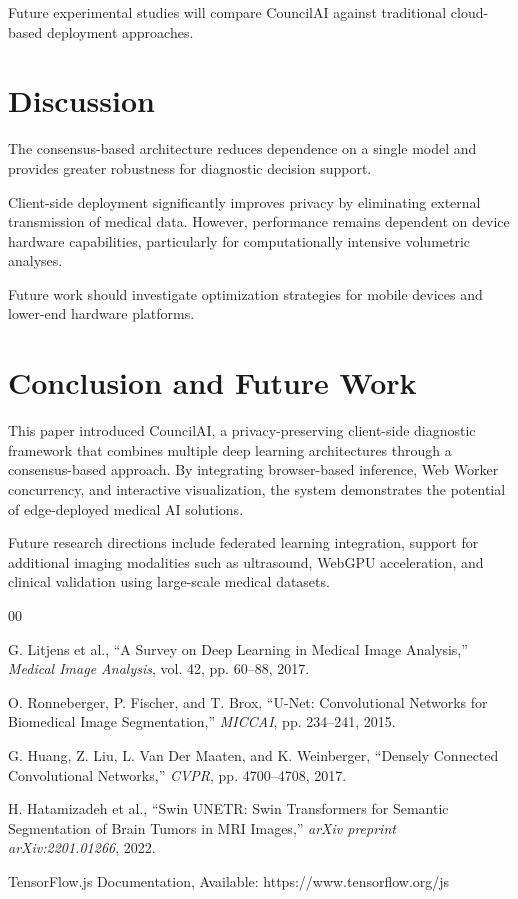 \documentclass[journal]{IEEEtran}
\begin{document}
Future experimental studies will compare CouncilAI against traditional cloud-based deployment approaches.

\section{Discussion}

The consensus-based architecture reduces dependence on a single model and provides greater robustness for diagnostic decision support.

Client-side deployment significantly improves privacy by eliminating external transmission of medical data. However, performance remains dependent on device hardware capabilities, particularly for computationally intensive volumetric analyses.

Future work should investigate optimization strategies for mobile devices and lower-end hardware platforms.

\section{Conclusion and Future Work}

This paper introduced CouncilAI, a privacy-preserving client-side diagnostic framework that combines multiple deep learning architectures through a consensus-based approach. By integrating browser-based inference, Web Worker concurrency, and interactive visualization, the system demonstrates the potential of edge-deployed medical AI solutions.

Future research directions include federated learning integration, support for additional imaging modalities such as ultrasound, WebGPU acceleration, and clinical validation using large-scale medical datasets.

\begin{thebibliography}{00}

G. Litjens et al.,
``A Survey on Deep Learning in Medical Image Analysis,''
\textit{Medical Image Analysis},
vol. 42, pp. 60--88, 2017.

O. Ronneberger, P. Fischer, and T. Brox,
``U-Net: Convolutional Networks for Biomedical Image Segmentation,''
\textit{MICCAI},
pp. 234--241, 2015.

G. Huang, Z. Liu, L. Van Der Maaten, and K. Weinberger,
``Densely Connected Convolutional Networks,''
\textit{CVPR},
pp. 4700--4708, 2017.

H. Hatamizadeh et al.,
``Swin UNETR: Swin Transformers for Semantic Segmentation of Brain Tumors in MRI Images,''
\textit{arXiv preprint arXiv:2201.01266},
2022.

TensorFlow.js Documentation,
Available: https://www.tensorflow.org/js

\end{thebibliography}
\end{document}
